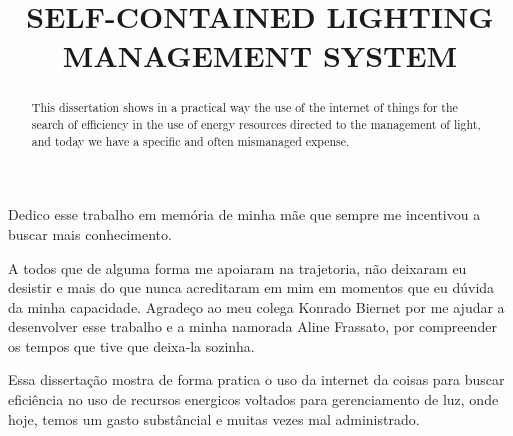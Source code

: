 \documentclass[openright]{normas-utf-tex} %
\title{\MakeUppercase{Self-contained lighting management system}} %
\begin{document}
\capa %
\folhaderosto %

\fichacatpgbib{\pageref{bibstart}-\pageref{bibend}}
\fichacat



\begin{dedicatoria}
Dedico esse trabalho em memória de minha mãe que sempre me incentivou a buscar mais conhecimento.
\end{dedicatoria}

\begin{agradecimentos}
A todos que de alguma forma me apoiaram na trajetoria, não deixaram eu desistir e mais do que nunca acreditaram em mim em momentos que eu dúvida da minha capacidade.
Agradeço ao meu colega Konrado Biernet por me ajudar a desenvolver esse trabalho e a minha namorada Aline Frassato, por compreender os tempos que tive que deixa-la sozinha.
\end{agradecimentos}

\begin{resumo}
Essa dissertação mostra de forma pratica o uso da internet da coisas para buscar eficiência no uso de recursos energicos voltados para gerenciamento de luz, onde hoje, temos um gasto substâncial e muitas vezes mal administrado.
\end{resumo}

\begin{abstract}
This dissertation shows in a practical way the use of the internet of things for the search of efficiency in the use of energy resources directed to the management of light, and today we have a specific and often mismanaged expense.
\end{abstract}

\listadefiguras %


\sumario %
\end{document}
